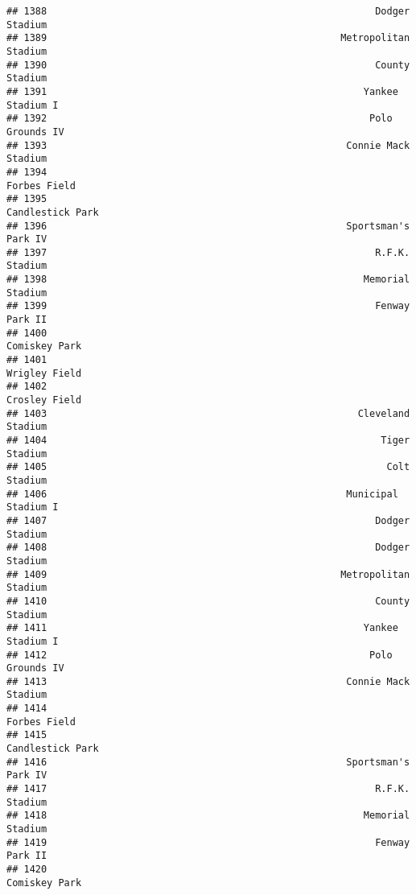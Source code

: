 \documentclass[]{article}
\begin{document}
\begin{verbatim}
## 1388                                                         Dodger Stadium
## 1389                                                   Metropolitan Stadium
## 1390                                                         County Stadium
## 1391                                                       Yankee Stadium I
## 1392                                                        Polo Grounds IV
## 1393                                                    Connie Mack Stadium
## 1394                                                           Forbes Field
## 1395                                                       Candlestick Park
## 1396                                                    Sportsman's Park IV
## 1397                                                         R.F.K. Stadium
## 1398                                                       Memorial Stadium
## 1399                                                         Fenway Park II
## 1400                                                          Comiskey Park
## 1401                                                          Wrigley Field
## 1402                                                          Crosley Field
## 1403                                                      Cleveland Stadium
## 1404                                                          Tiger Stadium
## 1405                                                           Colt Stadium
## 1406                                                    Municipal Stadium I
## 1407                                                         Dodger Stadium
## 1408                                                         Dodger Stadium
## 1409                                                   Metropolitan Stadium
## 1410                                                         County Stadium
## 1411                                                       Yankee Stadium I
## 1412                                                        Polo Grounds IV
## 1413                                                    Connie Mack Stadium
## 1414                                                           Forbes Field
## 1415                                                       Candlestick Park
## 1416                                                    Sportsman's Park IV
## 1417                                                         R.F.K. Stadium
## 1418                                                       Memorial Stadium
## 1419                                                         Fenway Park II
## 1420                                                          Comiskey Park

\end{verbatim}
\end{document}
